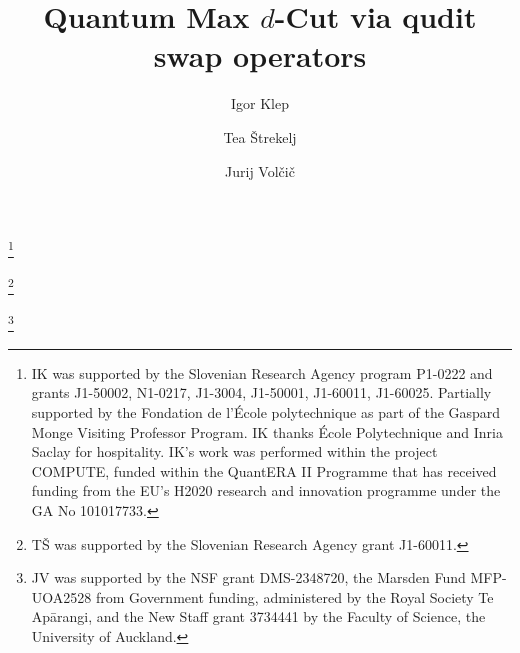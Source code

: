 \documentclass[12pt,dvipsnames,accepted=2016-08-18,a4paper,onecolumn]{quantumarticle}
\numberwithin{equation}{section}
\theoremstyle{definition}
\begin{document}
\title{Quantum Max $d$-Cut via qudit swap operators}

\author{Igor Klep}
\address{Faculty of Mathematics and Physics, Department of Mathematics,  University of Ljubljana \& 
FAMNIT, University of Primorska, Koper \&
Institute of Mathematics, Physics and Mechanics, Ljubljana, Slovenia}
\thanks{IK was supported by the Slovenian Research Agency program P1-0222 and grants J1-50002, N1-0217, J1-3004,
J1-50001, J1-60011, J1-60025.
Partially supported by the Fondation de l'École polytechnique as part of the Gaspard Monge Visiting Professor Program.
IK thanks École Polytechnique and Inria Saclay for hospitality.
IK's work was performed within the project
COMPUTE, funded within the QuantERA II Programme that has
received funding from the EU’s H2020 research and innovation
programme under the GA No 101017733. {\normalsize\euflag}}

\author{Tea \v{S}trekelj}
\address{Department of Mathematics, FAMNIT, University of Primorska, Koper, Slovenia}
\thanks{TŠ was supported by the Slovenian Research Agency grant J1-60011.}
\author{Jurij Vol\v{c}i\v{c}}
\address{Department of Mathematics, University of Auckland, Auckland, New Zealand}
\thanks{JV was supported by the NSF grant DMS-2348720, the Marsden Fund MFP-UOA2528 from Government funding, administered by the Royal Society Te Ap\={a}rangi, and the New Staff grant 3734441 by the Faculty of Science, the University of Auckland.}







\end{document}
